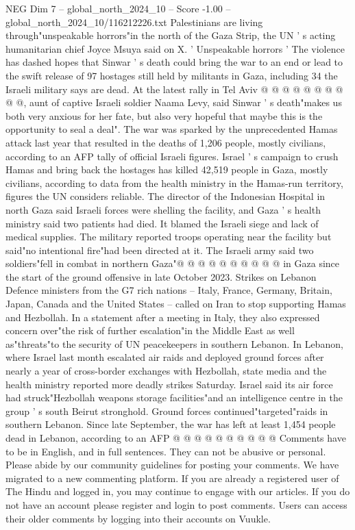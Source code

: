 \begin{textsample}{NEG Dim 7 – global\_north\_2024\_10 – Score -1.00 – global\_north\_2024\_10/116212226.txt}
Palestinians are living through"unspeakable horrors"in the north of the Gaza Strip, the UN ' s acting humanitarian chief Joyce Msuya said on X. ' Unspeakable horrors ' The violence has dashed hopes that Sinwar ' s death could bring the war to an end or lead to the swift release of 97 hostages still held by militants in Gaza, including 34 the Israeli military says are dead.
At the latest rally in Tel Aviv @ @ @ @ @ @ @ @ @ @, aunt of captive Israeli soldier Naama Levy, said Sinwar ' s death"makes us both very anxious for her fate, but also very hopeful that maybe this is the opportunity to seal a deal".
The war was sparked by the unprecedented Hamas attack last year that resulted in the deaths of 1,206 people, mostly civilians, according to an AFP tally of official Israeli figures.
Israel ' s campaign to crush Hamas and bring back the hostages has killed 42,519 people in Gaza, mostly civilians, according to data from the health ministry in the Hamas-run territory, figures the UN considers reliable.
The director of the Indonesian Hospital in north Gaza said Israeli forces were shelling the facility, and Gaza ' s health ministry said two patients had died.
It blamed the Israeli siege and lack of medical supplies.
The military reported troops operating near the facility but said"no intentional fire"had been directed at it.
The Israeli army said two soldiers"fell in combat in northern Gaza"@ @ @ @ @ @ @ @ @ @ in Gaza since the start of the ground offensive in late October 2023.
Strikes on Lebanon Defence ministers from the G7 rich nations -- Italy, France, Germany, Britain, Japan, Canada and the United States -- called on Iran to stop supporting Hamas and Hezbollah.
In a statement after a meeting in Italy, they also expressed concern over"the risk of further escalation"in the Middle East as well as"threats"to the security of UN peacekeepers in southern Lebanon.
In Lebanon, where Israel last month escalated air raids and deployed ground forces after nearly a year of cross-border exchanges with Hezbollah, state media and the health ministry reported more deadly strikes Saturday.
Israel said its air force had struck"Hezbollah weapons storage facilities"and an intelligence centre in the group ' s south Beirut stronghold.
Ground forces continued"targeted"raids in southern Lebanon.
Since late September, the war has left at least 1,454 people dead in Lebanon, according to an AFP @ @ @ @ @ @ @ @ @ @ Comments have to be in English, and in full sentences.
They can not be abusive or personal.
Please abide by our community guidelines for posting your comments.
We have migrated to a new commenting platform.
If you are already a registered user of The Hindu and logged in, you may continue to engage with our articles.
If you do not have an account please register and login to post comments.
Users can access their older comments by logging into their accounts on Vuukle.

\end{textsample}
